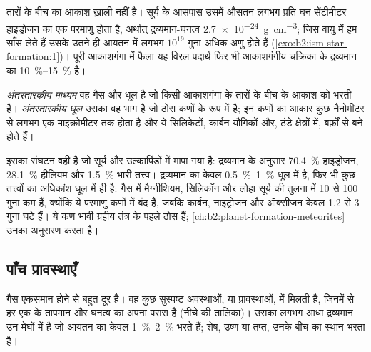 तारों के बीच का आकाश ख़ाली नहीं है। सूर्य के आसपास उसमें औसतन लगभग
प्रति घन सेंटीमीटर हाइड्रोजन का एक परमाणु होता है, अर्थात् द्रव्यमान-घनत्व
\qty{2.7e-24}{g.cm^{-3}}; जिस वायु में हम साँस लेते हैं उसके उतने ही आयतन में लगभग $10^{19}$ गुना अधिक
अणु होते हैं (\cref{exo:b2:ism-star-formation:1})। पूरी आकाशगंगा में फैला यह विरल
पदार्थ फिर भी आकाशगंगीय चक्रिका के द्रव्यमान का \qtyrange{10}{15}{\percent}
है।

\begin{definition}
\label{def:b2:ism-star-formation:ism}
\emph{अंतरतारकीय माध्यम} वह गैस और धूल है
जो किसी आकाशगंगा के तारों के बीच के आकाश को भरती है। \emph{अंतरतारकीय
धूल} उसका वह भाग है जो ठोस कणों के रूप में है; इन कणों का आकार कुछ
नैनोमीटर से लगभग एक माइक्रोमीटर तक होता है और ये सिलिकेटों, कार्बन यौगिकों
और, ठंडे क्षेत्रों में, बर्फ़ों से बने होते हैं।
\end{definition}

इसका संघटन वही है जो सूर्य और उल्कापिंडों में मापा गया है: द्रव्यमान के अनुसार
\qty{70.4}{\percent} हाइड्रोजन, \qty{28.1}{\percent} हीलियम और
\qty{1.5}{\percent} भारी तत्त्व। द्रव्यमान का केवल \qtyrange{0.5}{1}{\percent}
धूल में है, फिर भी कुछ तत्त्वों का अधिकांश धूल में ही है: गैस में
मैग्नीशियम, सिलिकॉन और लोहा सूर्य की तुलना में 10 से 100 गुना कम हैं, क्योंकि
ये परमाणु कणों में बंद हैं, जबकि कार्बन, नाइट्रोजन और ऑक्सीजन
केवल 1.2 से 3 गुना घटे हैं। ये कण भावी ग्रहीय तंत्र के पहले ठोस हैं;
\cref{ch:b2:planet-formation-meteorites}
उनका अनुसरण करता है।

\subsection{पाँच प्रावस्थाएँ}

गैस एकसमान होने से बहुत दूर है। वह कुछ सुस्पष्ट अवस्थाओं, या प्रावस्थाओं, में मिलती है,
जिनमें से हर एक के तापमान और घनत्व का अपना परास है (नीचे की तालिका)। उसका लगभग आधा
द्रव्यमान उन मेघों में है जो आयतन का केवल \qtyrange{1}{2}{\percent} भरते हैं;
शेष, उष्ण या तप्त, उनके बीच का स्थान भरता है।

